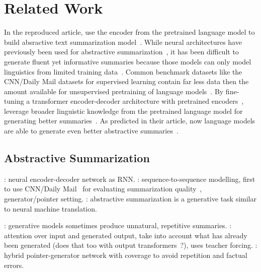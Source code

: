 \section{Related Work} %

In the reproduced article, \citeauthor{LiuL2019} use the encoder from the pretrained \Bert language model to build absractive text summarization model~\cite{LiuL2019,DevlinCLT2019}.
While neural architectures have previously been used for abstractive summarization~\cite{NallapatiZSGX2016,SeeLM2017,Paulus2018}, it has been difficult to generate fluent yet informative summaries because those models can only model linguistics from limited training data~\todocite. Common benchmark datasets like the CNN/Daily Mail datasets for supervised learning contain far less data then the amount available for unsupervised pretraining of language models~\cite{HermannKGEKSB2015,DevlinCLT2019}.
By fine-tuning a transformer encoder-decoder architecture with pretrained encoders~\cite{VaswaniSPUJGKP2017,DevlinCLT2019}, \citeauthor{LiuL2019} leverage broader linguistic knowledge from the pretrained language model for generating better summaries~\cite{LiuL2019}.
As predicted in their article, now  language models are able to generate even better abstractive summaries~\todocite\cite{LiuL2019}.

\subsection{Abstractive Summarization}


\citeauthor{Sutskever2014?,Chopra2016?,NallapatiZSGX2016}: neural encoder-decoder network as RNN.
\citeauthor{NallapatiZSGX2016}: sequence-to-sequence modelling, first to use CNN/Daily Mail~\cite{HermannKGEKSB2015} for evaluating summarization quality~\cite{T5}, generator/pointer setting.
\citeauthor{???}: abstractive summarization is a generative task similar to neural machine translation.

\citeauthor{Paulus2018,SeeLM2017}: generative models sometimes produce unnatural, repetitive summaries.
\citeauthor{Paulus2018}: attention over input and generated output, take into account what has already been generated (\Bert does that too with output transformers~\cite{DevlinCLT2019}?), uses teacher forcing.
\citeauthor{SeeLM2017}: hybrid pointer-generator network with coverage to avoid repetition and factual errors.

